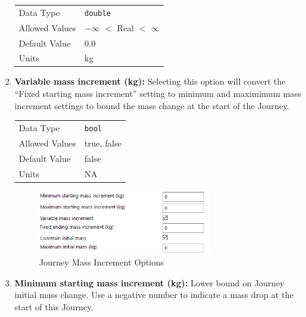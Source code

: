 \begin{enumerate}
        \begin{table}[H]
            \hspace{2cm}
            \begin{tabular}{ll}
            Data Type & \verb|double| \\
            Allowed Values & $-\infty$ $<$ Real $<$ $\infty$ \\
            Default Value & 0.0 \\
            Units & kg 
            \end{tabular}
        \end{table}


    \item \textbf{Variable mass increment (kg):} Selecting this option will convert the ``Fixed starting mass increment'' setting to  minimum and maximimum mass increment settings to bound the mass change at the start of the Journey.
        
        \begin{table}[H]
            \hspace{2cm}
            \begin{tabular}{ll}
            Data Type & \verb|bool| \\
            Allowed Values & true, false \\
            Default Value & false \\
            Units & NA
            \end{tabular}
        \end{table}

        \begin{figure}[H]
            \centering
            \includegraphics[width=0.7\textwidth]{../../shared_latex_inputs/images/pyemtg_journey_mass_increment.png}
            \caption{Journey Mass Increment Options}
            \label{fig:pyemtg_journey_mass_increment}
        \end{figure}

        
        \item \textbf{Minimum starting mass increment (kg):} Lower bound on Journey initial mass change. Use a negative number to indicate a mass drop at the start of this Journey. 
    

\end{enumerate}
